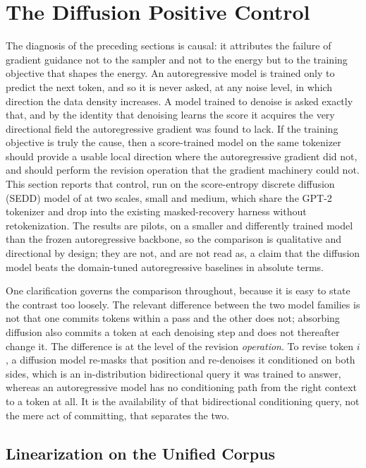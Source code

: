 \section{The Diffusion Positive Control}
\label{sec:results-diffusion}

The diagnosis of the preceding sections is causal: it attributes the failure of gradient guidance not to the sampler and not to the energy but to the training objective that shapes the energy. An autoregressive model is trained only to predict the next token, and so it is never asked, at any noise level, in which direction the data density increases. A model trained to denoise is asked exactly that, and by the identity that denoising learns the score \citep{vincent2011connection} it acquires the very directional field the autoregressive gradient was found to lack. If the training objective is truly the cause, then a score-trained model on the same tokenizer should provide a usable local direction where the autoregressive gradient did not, and should perform the revision operation that the gradient machinery could not. This section reports that control, run on the score-entropy discrete diffusion (SEDD) model of \citet{lou2024discrete} at two scales, small and medium, which share the GPT-2 tokenizer and drop into the existing masked-recovery harness without retokenization. The results are pilots, on a smaller and differently trained model than the frozen autoregressive backbone, so the comparison is qualitative and directional by design; they are not, and are not read as, a claim that the diffusion model beats the domain-tuned autoregressive baselines in absolute terms.

One clarification governs the comparison throughout, because it is easy to state the contrast too loosely. The relevant difference between the two model families is not that one commits tokens within a pass and the other does not; absorbing diffusion also commits a token at each denoising step and does not thereafter change it. The difference is at the level of the revision \emph{operation}. To revise token $i$, a diffusion model re-masks that position and re-denoises it conditioned on both sides, which is an in-distribution bidirectional query it was trained to answer, whereas an autoregressive model has no conditioning path from the right context to a token at all. It is the availability of that bidirectional conditioning query, not the mere act of committing, that separates the two.

\subsection{Linearization on the Unified Corpus}
\label{sec:results-diffusion-lin}

